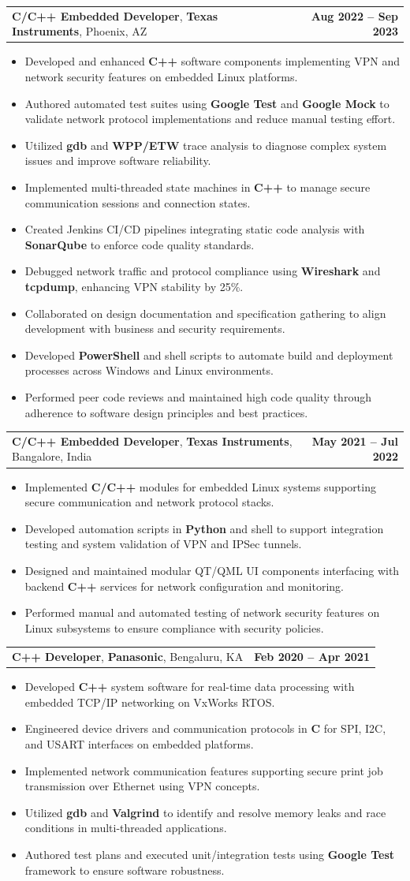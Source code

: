 \documentclass[letterpaper,11pt]{article}
\makeatletter
\newcommand{\resumeItem}[1]{
  \item\footnotesize{
    {#1 \vspace{-2pt}}
  }
}
\newcommand{\resumeSubheading}[4]{
  \vspace{-2pt}\item
    \begin{tabular*}{1.0\textwidth}[t]{l@{\extracolsep{\fill}}r}
      \textbf{\fontsize{10pt}{14pt}\selectfont #3}, \textbf{\fontsize{10pt}{14pt}\selectfont #1}, \fontsize{10pt}{14pt}\selectfont #4 & \textbf{\fontsize{10pt}{14pt}\selectfont #2} \\
    \end{tabular*}\vspace{-7pt}
}
\newcommand{\resumeItemListStart}{\begin{itemize}[leftmargin=*]}
\newcommand{\resumeItemListEnd}{\end{itemize}\vspace{-5pt}}
\makeatother
\begin{document}
    \resumeSubheading
        {Texas Instruments}{Aug 2022 -- Sep 2023}
        {C/C++ Embedded Developer}{Phoenix, AZ}
      \resumeItemListStart
        \resumeItem{Developed and enhanced \textbf{C++} software components implementing VPN and network security features on embedded Linux platforms.}
        \resumeItem{Authored automated test suites using \textbf{Google Test} and \textbf{Google Mock} to validate network protocol implementations and reduce manual testing effort.}
        \resumeItem{Utilized \textbf{gdb} and \textbf{WPP/ETW} trace analysis to diagnose complex system issues and improve software reliability.}
        \resumeItem{Implemented multi-threaded state machines in \textbf{C++} to manage secure communication sessions and connection states.}
        \resumeItem{Created Jenkins CI/CD pipelines integrating static code analysis with \textbf{SonarQube} to enforce code quality standards.}
        \resumeItem{Debugged network traffic and protocol compliance using \textbf{Wireshark} and \textbf{tcpdump}, enhancing VPN stability by 25\%.}
        \resumeItem{Collaborated on design documentation and specification gathering to align development with business and security requirements.}
        \resumeItem{Developed \textbf{PowerShell} and shell scripts to automate build and deployment processes across Windows and Linux environments.}
        \resumeItem{Performed peer code reviews and maintained high code quality through adherence to software design principles and best practices.}
      \resumeItemListEnd

    \resumeSubheading
        {Texas Instruments}{May 2021 -- Jul 2022}
        {C/C++ Embedded Developer}{Bangalore, India}
      \resumeItemListStart
        \resumeItem{Implemented \textbf{C/C++} modules for embedded Linux systems supporting secure communication and network protocol stacks.}
        \resumeItem{Developed automation scripts in \textbf{Python} and shell to support integration testing and system validation of VPN and IPSec tunnels.}
        \resumeItem{Designed and maintained modular QT/QML UI components interfacing with backend \textbf{C++} services for network configuration and monitoring.}
        \resumeItem{Performed manual and automated testing of network security features on Linux subsystems to ensure compliance with security policies.}
      \resumeItemListEnd

    \resumeSubheading
        {Panasonic}{Feb 2020 -- Apr 2021}
        {C++ Developer}{Bengaluru, KA}
      \resumeItemListStart
        \resumeItem{Developed \textbf{C++} system software for real-time data processing with embedded TCP/IP networking on VxWorks RTOS.}
        \resumeItem{Engineered device drivers and communication protocols in \textbf{C} for SPI, I2C, and USART interfaces on embedded platforms.}
        \resumeItem{Implemented network communication features supporting secure print job transmission over Ethernet using VPN concepts.}
        \resumeItem{Utilized \textbf{gdb} and \textbf{Valgrind} to identify and resolve memory leaks and race conditions in multi-threaded applications.}
        \resumeItem{Authored test plans and executed unit/integration tests using \textbf{Google Test} framework to ensure software robustness.}
      \resumeItemListEnd
\end{document}
